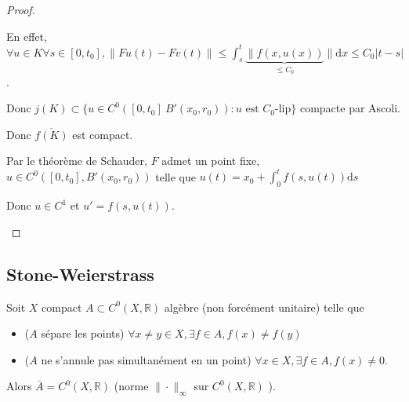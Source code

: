 \begin{proof}
\begin{itemize}
			En effet, $\forall  u \in K \forall s \in  [0,t_0], \|Fu\left( t \right) -Fv\left( t \right) \| \le \int_{s}^{t} \underbrace{\|f\left( x, u\left( x \right)  \right)}_{\le C_0} \| \mathrm{d} x \le C_0 |t-s|$.

			Donc $j\left( K \right) \subset \{u \in C^0\left( [0,t_0] \ B'\left( x_0, r_0 \right) \right) : u \text{ est } C_0\text{-lip} \} $ compacte par Ascoli.

			Donc $\overline{f\left( K \right) }$ est compact.

			Par le théorème de Schauder, $F$ admet un point fixe, $ u \in C^0\left( [0,t_0], B'\left( x_0, r_0 \right)  \right) $ telle que $u\left( t \right) = x_0 + \int_{0}^{t} f(s, u\left( t \right) ) \mathrm{d} s $

			Donc $u \in C^1$ et $u' = f\left( s, u\left( t \right)  \right) $.
	\end{itemize}
\end{proof}

\subsection{Stone-Weierstrass}

\begin{theoreme}
	Soit $X$ compact $A \subset C^0\left( X, \mathbb{R} \right) $ algèbre (non forcément unitaire) telle que
	\begin{itemize}
		\item ($A$ sépare les points) $\forall x\neq y \in X, \exists f \in A, f(x) \neq  f(y)$
		\item ($A$ ne s'annule pas simultanément en un point) $\forall x \in X, \exists f \in A, f(x) \neq 0$.
	\end{itemize}

	Alors $\overline{A} = C^0 \left( X,\mathbb{R} \right) $ (norme $\|\cdot \|_{\infty}$ sur $C^0\left(X,\mathbb{R} \right)$ ).
\end{theoreme}

